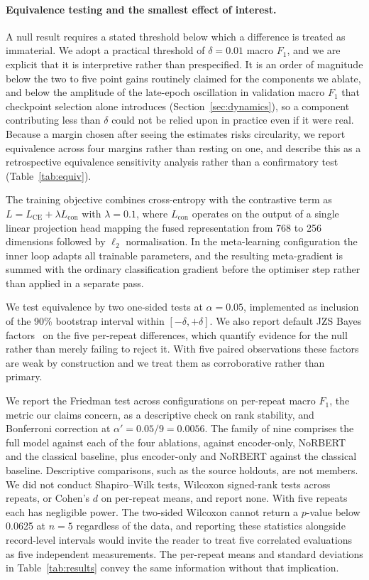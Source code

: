\documentclass[11pt,a4paper]{article}
\begin{document}
\paragraph{Equivalence testing and the smallest effect of interest.}
A null result requires a stated threshold below which a difference is treated as
immaterial. We adopt a practical threshold of $\delta = 0.01$ macro $F_1$, and we are explicit that it
is interpretive rather than prespecified. It is an order of magnitude below the two to five
point gains routinely claimed for the components we ablate, and below the amplitude of the
late-epoch oscillation in validation macro $F_1$ that checkpoint selection alone introduces
(Section~\ref{sec:dynamics}), so a component contributing less than $\delta$ could not be
relied upon in practice even if it were real. Because a margin chosen after seeing the
estimates risks circularity, we report equivalence across four margins rather than resting on
one, and describe this as a retrospective equivalence sensitivity analysis rather than a
confirmatory test (Table~\ref{tab:equiv}).

The training objective combines cross-entropy with the contrastive term as
$L = L_{\mathrm{CE}} + \lambda L_{\mathrm{con}}$ with $\lambda = 0.1$, where
$L_{\mathrm{con}}$ operates on the output of a single linear projection head mapping the fused
representation from 768 to 256 dimensions followed by $\ell_2$ normalisation. In the
meta-learning configuration the inner loop adapts all trainable parameters, and the resulting
meta-gradient is summed with the ordinary classification gradient before the optimiser step
rather than applied in a separate pass.

We test equivalence by two one-sided tests at $\alpha = 0.05$, implemented as inclusion of
the 90\% bootstrap interval within $[-\delta, +\delta]$. We also report default JZS Bayes
factors~\cite{rouder2009} on the five per-repeat differences, which quantify evidence for
the null rather than merely failing to reject it. With five paired observations these
factors are weak by construction and we treat them as corroborative rather than primary.

We report the Friedman test across configurations on per-repeat macro $F_1$, the metric our
claims concern, as a descriptive check on rank stability, and Bonferroni correction at $\alpha' = 0.05/9 = 0.0056$. The family of nine comprises the full model against each of the four ablations, against
encoder-only, NoRBERT and the classical baseline, plus encoder-only and NoRBERT against the
classical baseline. Descriptive comparisons, such as the source holdouts, are not members. We did not conduct Shapiro--Wilk tests, Wilcoxon signed-rank tests across repeats, or
Cohen's $d$ on per-repeat means, and report none. With five repeats each has negligible
power. The two-sided Wilcoxon cannot return a $p$-value below 0.0625 at $n = 5$ regardless
of the data, and reporting these statistics alongside record-level intervals would invite
the reader to treat five correlated evaluations as five independent measurements. The
per-repeat means and standard deviations in Table~\ref{tab:results} convey the same
information without that implication.
\end{document}
